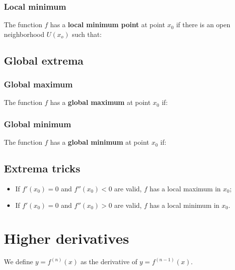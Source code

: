 \documentclass{article}
\begin{document}
\subsubsection{Local minimum}
The function $f$ has a \textbf{local minimum point} at point $x_0$ if
there is an open neighborhood $U(x_o)$ such that:

\subsection{Global extrema}
\subsubsection{Global maximum}
The function $f$ has a \textbf{global maximum} at point $x_0$ if:

\subsubsection{Global minimum}
The function $f$ has a \textbf{global minimum} at point $x_0$ if:

\subsection{Extrema tricks}
\begin{itemize}
    \item If $f'(x_0) = 0$ and $f''(x_0) < 0$ are valid, $f$ has a local maximum in $x_0$;
    \item If $f'(x_0) = 0$ and $f''(x_0) > 0$ are valid, $f$ has a local minimum in $x_0$.
\end{itemize}


\section{Higher derivatives}
We define $y=f^{(n)}(x)$ as the derivative of $y=f^{(n-1)}(x)$.

\end{document}
